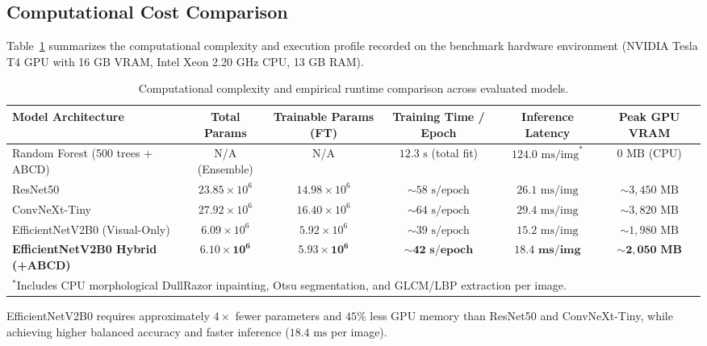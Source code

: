 \documentclass[11pt,a4paper]{article}
\begin{document}
\subsection{Computational Cost Comparison}
Table~\ref{tab:computational_cost} summarizes the computational complexity and execution profile recorded on the benchmark hardware environment (NVIDIA Tesla T4 GPU with 16 GB VRAM, Intel Xeon 2.20 GHz CPU, 13 GB RAM).

\begin{table}[htbp]
\centering
\small
\caption{Computational complexity and empirical runtime comparison across evaluated models.}
\label{tab:computational_cost}
\vspace{0.4em}
\begin{tabular}{lccccc}
\toprule
\textbf{Model Architecture} & \textbf{Total Params} & \textbf{Trainable Params (FT)} & \textbf{Training Time / Epoch} & \textbf{Inference Latency} & \textbf{Peak GPU VRAM} \\
\midrule
Random Forest (500 trees + ABCD) & N/A (Ensemble) & N/A & $12.3\text{ s}$ (total fit) & $124.0\text{ ms/img}^*$ & $0\text{ MB}$ (CPU) \\
ResNet50 \cite{he2016} & $23.85 \times 10^6$ & $14.98 \times 10^6$ & $\sim 58\text{ s/epoch}$ & $26.1\text{ ms/img}$ & $\sim 3,450\text{ MB}$ \\
ConvNeXt-Tiny \cite{liu2022} & $27.92 \times 10^6$ & $16.40 \times 10^6$ & $\sim 64\text{ s/epoch}$ & $29.4\text{ ms/img}$ & $\sim 3,820\text{ MB}$ \\
EfficientNetV2B0 (Visual-Only) & $6.09 \times 10^6$ & $5.92 \times 10^6$ & $\sim 39\text{ s/epoch}$ & $15.2\text{ ms/img}$ & $\sim 1,980\text{ MB}$ \\
\textbf{EfficientNetV2B0 Hybrid (+ABCD)} & $\mathbf{6.10 \times 10^6}$ & $\mathbf{5.93 \times 10^6}$ & $\mathbf{\sim 42\text{ s/epoch}}$ & $\mathbf{18.4\text{ ms/img}}$ & $\mathbf{\sim 2,050\text{ MB}}$ \\
\bottomrule
\multicolumn{6}{l}{\footnotesize $^*$Includes CPU morphological DullRazor inpainting, Otsu segmentation, and GLCM/LBP extraction per image.}
\end{tabular}
\end{table}

EfficientNetV2B0 requires approximately $4\times$ fewer parameters and $45\%$ less GPU memory than ResNet50 and ConvNeXt-Tiny, while achieving higher balanced accuracy and faster inference ($18.4\text{ ms}$ per image).

\end{document}
